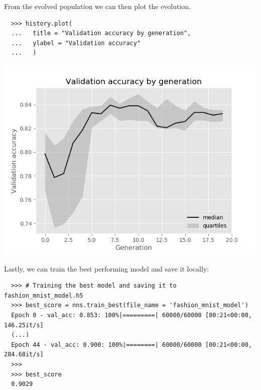 \documentclass[a4paper,10pt]{article}
\begin{document}
\pagebreak
From the evolved population we can then plot the evolution.
\lstset{caption = Plotting the evolution}
\begin{lstlisting}
  >>> history.plot(
  ...   title = "Validation accuracy by generation",
  ...   ylabel = "Validation accuracy"
  ...   )
\end{lstlisting}

\begin{center}
  \includegraphics[scale=0.5]{gfx/fashion_mnist_example.png}
\end{center}

Lastly, we can train the best performing model and save it locally:

\lstset{caption = Saving the model with the optimised hyperparameters}
\begin{lstlisting}
  >>> # Training the best model and saving it to fashion_mnist_model.h5
  >>> best_score = nns.train_best(file_name = 'fashion_mnist_model')
  Epoch 0 - val_acc: 0.853: 100%|=========| 60000/60000 [00:21<00:00, 146.25it/s]
  (...)
  Epoch 44 - val_acc: 0.900: 100%|========| 60000/60000 [00:21<00:00, 284.68it/s]
  >>>
  >>> best_score
  0.9029
\end{lstlisting}
\end{document}
